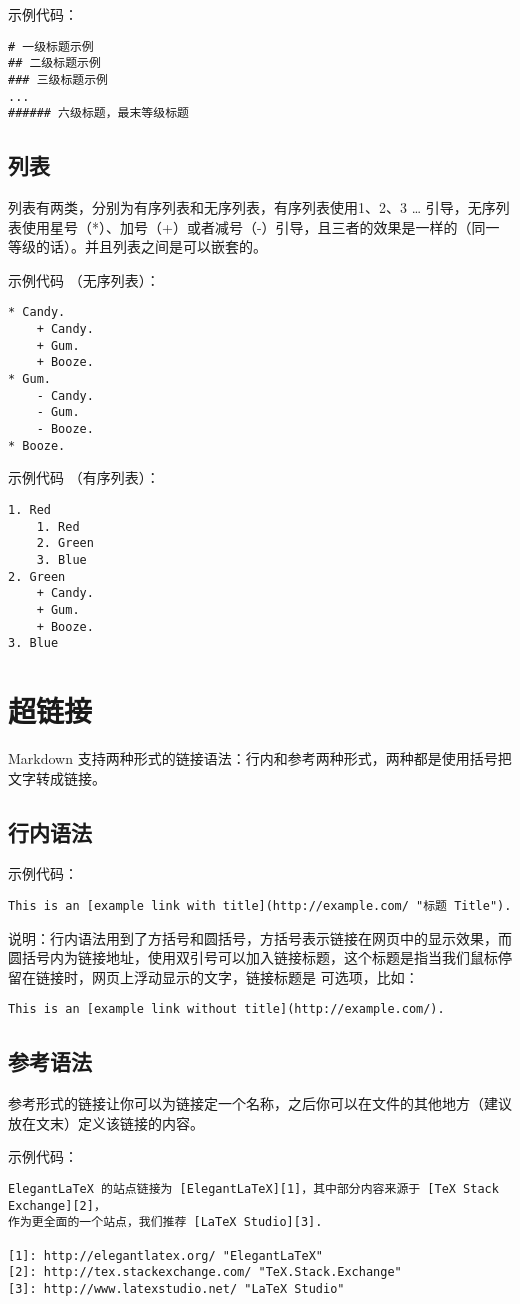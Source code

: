 示例代码：
\begin{verbatim}
# 一级标题示例
## 二级标题示例
### 三级标题示例
...
###### 六级标题，最末等级标题
\end{verbatim}


\subsection{列表}
列表有两类，分别为有序列表和无序列表，有序列表使用1、2、3 … 引导，无序列表使用星号（*）、加号（+）或者减号（-）引导，且三者的效果是一样的（同一等级的话）。并且列表之间是可以嵌套的。

示例代码 （无序列表）：
\begin{verbatim}
* Candy.
    + Candy.
    + Gum.
    + Booze.
* Gum.
    - Candy.
    - Gum.
    - Booze.
* Booze.
\end{verbatim}

示例代码 （有序列表）：
\begin{verbatim}
1. Red
    1. Red
    2. Green
    3. Blue
2. Green
    + Candy.
    + Gum.
    + Booze.
3. Blue
\end{verbatim}



\section{超链接}
Markdown 支持两种形式的链接语法：行内和参考两种形式，两种都是使用括号把文字转成链接。

\subsection{行内语法}
示例代码：

\verb|This is an [example link with title](http://example.com/ "标题 Title").|

说明：行内语法用到了方括号和圆括号，方括号表示链接在网页中的显示效果，而圆括号内为链接地址，使用双引号可以加入链接标题，这个标题是指当我们鼠标停留在链接时，网页上浮动显示的文字，链接标题是 可选项，比如：

\verb|This is an [example link without title](http://example.com/).|


\subsection{参考语法}
参考形式的链接让你可以为链接定一个名称，之后你可以在文件的其他地方（建议放在文末）定义该链接的内容。

示例代码：
\begin{verbatim}
ElegantLaTeX 的站点链接为 [ElegantLaTeX][1]，其中部分内容来源于 [TeX Stack Exchange][2]，
作为更全面的一个站点，我们推荐 [LaTeX Studio][3].

[1]: http://elegantlatex.org/ "ElegantLaTeX"
[2]: http://tex.stackexchange.com/ "TeX.Stack.Exchange"
[3]: http://www.latexstudio.net/ "LaTeX Studio"
\end{verbatim}


